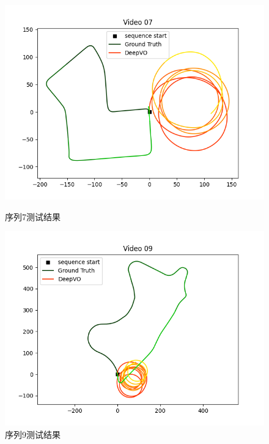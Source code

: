 \begin{figure}[H]
	\begin{minipage}{0.45\textwidth}
		\centering
		\includegraphics[width=\textwidth]{images/DeepVO/route_07_gradient.png}
		\caption{序列7测试结果}
		\label{fig:deepvo:7}
	\end{minipage}
	\hfill
	\begin{minipage}{0.45\textwidth}
		\centering
		\includegraphics[width=\textwidth]{images/DeepVO/route_09_gradient.png} 	
		\caption{序列9测试结果}
		\label{fig:deepvo:9}
	\end{minipage}
	
	

\end{figure}
